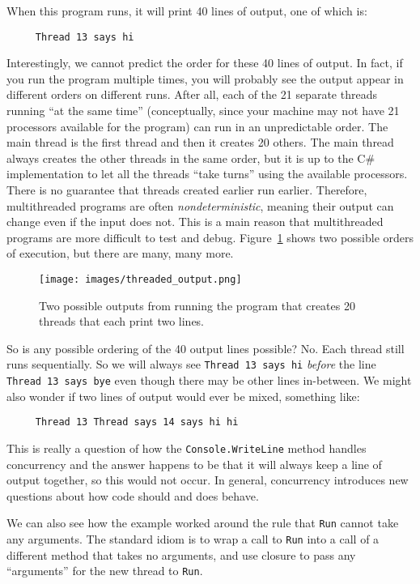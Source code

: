 \documentclass[10pt]{article}
\begin{document}
When this program runs, it will print 40 lines of output, one of which
is:
\begin{verbatim}
     Thread 13 says hi
\end{verbatim}
Interestingly, we cannot predict the order for these 40 lines of
output.  In fact, if you run the program multiple times, you will
probably see the output appear in different orders on different runs.
After all, each of the 21 separate threads running ``at the same
time'' (conceptually, since your machine may not have 21 processors
available for the program) can run in an unpredictable order.  The
main thread is the first thread and then it creates 20 others.  The
main thread always creates the other threads in the same
order, but it is up to the C\# implementation to let all the
threads ``take turns'' using the available processors.  There is no
guarantee that threads created earlier run earlier.  Therefore,
multithreaded programs are often \emph{nondeterministic}, meaning
their output can change even if the input does not.  This is a main
reason that multithreaded programs are more difficult to test and
debug.  Figure~\ref{fig:thread_output} shows two possible orders of
execution, but there are many, many more.

\begin{figure}
\begin{center}
\texttt{[image: images/threaded\_output.png]}
\end{center}
\caption{Two possible outputs from running the program that creates 20
threads that each print two lines.}
\label{fig:thread_output}
\end{figure}

So is any possible ordering of the 40 output lines possible?  No.
Each thread still runs sequentially.  So we will always see
\verb|Thread 13 says hi|
\emph{before} the line
\verb|Thread 13 says bye|
even though there may be other lines in-between.
We might also wonder if two lines of output would ever be mixed,
something like:
\begin{verbatim}
     Thread 13 Thread says 14 says hi hi
\end{verbatim}
This is really a question of how the {\tt Console.WriteLine} method
handles concurrency and the answer happens to be that it will always
keep a line of output together, so this would not occur.  In general,
concurrency introduces new questions about how code should and does
behave.

We can also see how the example worked around the rule that {\tt Run}
cannot take any arguments. The standard idiom is to wrap a call to
{\tt Run} into a call of a different method that takes no arguments,
and use closure to pass any “arguments” for the new thread to {\tt Run}.
\end{document}
